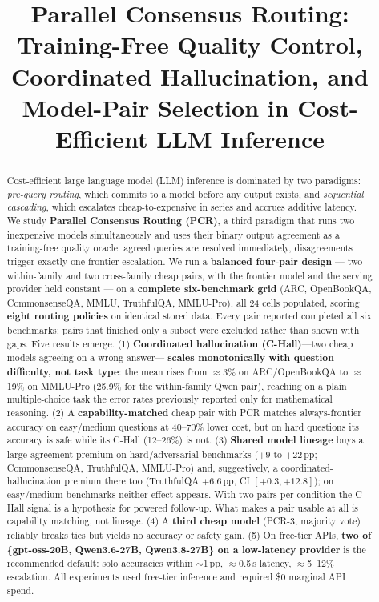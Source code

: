 \documentclass[conference]{IEEEtran}
\begin{document}
\title{Parallel Consensus Routing: Training-Free Quality Control, Coordinated
Hallucination, and Model-Pair Selection in Cost-Efficient LLM Inference}

\author{
}

\maketitle

\begin{abstract}
Cost-efficient large language model (LLM) inference is dominated by two
paradigms: \textit{pre-query routing}, which commits to a model before any
output exists, and \textit{sequential cascading}, which escalates cheap-to-expensive
in series and accrues additive latency. We study \textbf{Parallel Consensus
Routing (PCR)}, a third paradigm that runs two inexpensive models simultaneously
and uses their binary output agreement as a training-free quality oracle: agreed
queries are resolved immediately, disagreements trigger exactly one frontier
escalation. We run a \textbf{balanced four-pair design} --- two within-family and
two cross-family cheap pairs, with the frontier model and the serving provider
held constant --- on a \textbf{complete six-benchmark grid} (ARC, OpenBookQA,
CommonsenseQA, MMLU, TruthfulQA, MMLU-Pro), all 24 cells populated, scoring
\textbf{eight routing policies} on identical stored data. Every pair reported
completed all six benchmarks; pairs that finished only a subset were excluded
rather than shown with gaps. Five results emerge. (1) \textbf{Coordinated
hallucination (C-Hall)}---two cheap models agreeing on a wrong answer---%
\textbf{scales monotonically with question difficulty, not task type}: the mean
rises from $\approx$3\% on ARC/OpenBookQA to $\approx$19\% on MMLU-Pro (25.9\%
for the within-family Qwen pair), reaching on a plain multiple-choice task the
error rates previously reported only for mathematical reasoning.
(2) A \textbf{capability-matched} cheap pair with PCR matches always-frontier
accuracy on easy/medium questions at 40--70\% lower cost, but on hard questions
its accuracy is safe while its C-Hall (12--26\%) is not. (3) \textbf{Shared model
lineage} buys a large agreement premium on hard/adversarial benchmarks
($+9$ to $+22$\,pp; CommonsenseQA, TruthfulQA, MMLU-Pro) and, suggestively, a
coordinated-hallucination premium there too (TruthfulQA $+6.6$\,pp, CI
$[+0.3,+12.8]$); on easy/medium benchmarks neither effect appears. With two pairs
per condition the C-Hall signal is a hypothesis for powered follow-up. What makes
a pair usable at all is capability matching, not lineage. (4) A \textbf{third cheap model}
(PCR-3, majority vote) reliably breaks ties but yields no accuracy or safety
gain. (5) On free-tier APIs, \textbf{two of \{gpt-oss-20B, Qwen3.6-27B,
Qwen3.8-27B\} on a low-latency provider} is the recommended default: solo
accuracies within $\sim$1\,pp, $\approx$0.5\,s latency, $\approx$5--12\%
escalation. All experiments used free-tier inference and required \$0 marginal
API spend.
\end{abstract}
\end{document}
